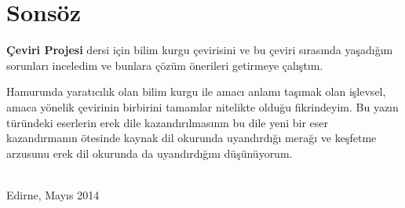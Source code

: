 
\thispagestyle{empty}
\chapter*{Sonsöz}

\textbf{Çeviri Projesi} dersi için bilim kurgu çevirisini ve bu çeviri sırasında
yaşadığım sorunları inceledim ve bunlara çözüm önerileri getirmeye çalıştım.

Hamurunda yaratıcılık olan bilim kurgu ile amacı anlamı taşımak olan işlevsel,
amaca yönelik çevirinin birbirini tamamlar nitelikte olduğu fikrindeyim. Bu
yazın türündeki eserlerin erek dile kazandırılmasının bu dile yeni bir eser
kazandırmanın ötesinde kaynak dil okurunda uyandırdığı merağı ve keşfetme
arzusunu erek dil okurunda da uyandırdığını düşünüyorum.

\begin{flushright}
  \textsc{\theauthor}\\
  Edirne, Mayıs 2014
\end{flushright}
